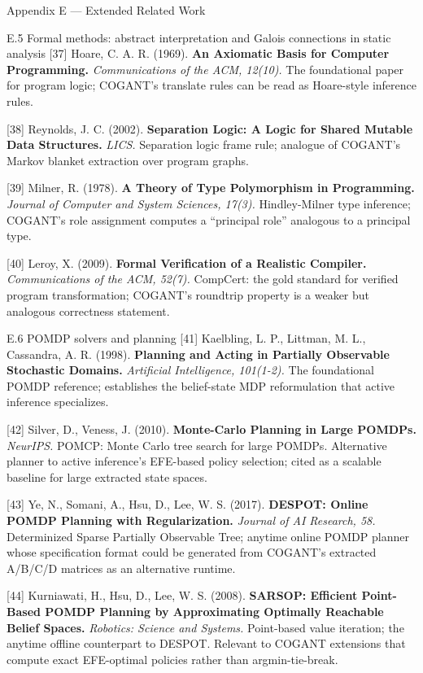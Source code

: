 \documentclass[
  ignorenonframetext,
]{beamer}
\begin{document}
\begin{frame}[fragile]{Appendix E --- Extended Related Work}
\begin{block}{E.5 Formal methods: abstract interpretation and Galois
connections in static analysis}
{[}37{]} Hoare, C. A. R. (1969). \textbf{An Axiomatic Basis for Computer
Programming.} \emph{Communications of the ACM, 12(10).} The foundational
paper for program logic; COGANT's translate rules can be read as
Hoare-style inference rules.

{[}38{]} Reynolds, J. C. (2002). \textbf{Separation Logic: A Logic for
Shared Mutable Data Structures.} \emph{LICS.} Separation logic frame
rule; analogue of COGANT's Markov blanket extraction over program
graphs.

{[}39{]} Milner, R. (1978). \textbf{A Theory of Type Polymorphism in
Programming.} \emph{Journal of Computer and System Sciences, 17(3).}
Hindley-Milner type inference; COGANT's role assignment computes a
``principal role'' analogous to a principal type.

{[}40{]} Leroy, X. (2009). \textbf{Formal Verification of a Realistic
Compiler.} \emph{Communications of the ACM, 52(7).} CompCert: the gold
standard for verified program transformation; COGANT's roundtrip
property is a weaker but analogous correctness statement.
\end{block}

\begin{block}{E.6 POMDP solvers and planning}
\protect{}\label{e.6-pomdp-solvers-and-planning}
{[}41{]} Kaelbling, L. P., Littman, M. L., Cassandra, A. R. (1998).
\textbf{Planning and Acting in Partially Observable Stochastic Domains.}
\emph{Artificial Intelligence, 101(1-2).} The foundational POMDP
reference; establishes the belief-state MDP reformulation that active
inference specializes.

{[}42{]} Silver, D., Veness, J. (2010). \textbf{Monte-Carlo Planning in
Large POMDPs.} \emph{NeurIPS.} POMCP: Monte Carlo tree search for large
POMDPs. Alternative planner to active inference's EFE-based policy
selection; cited as a scalable baseline for large extracted state
spaces.

{[}43{]} Ye, N., Somani, A., Hsu, D., Lee, W. S. (2017). \textbf{DESPOT:
Online POMDP Planning with Regularization.} \emph{Journal of AI
Research, 58.} Determinized Sparse Partially Observable Tree; anytime
online POMDP planner whose specification format could be generated from
COGANT's extracted A/B/C/D matrices as an alternative runtime.

{[}44{]} Kurniawati, H., Hsu, D., Lee, W. S. (2008). \textbf{SARSOP:
Efficient Point-Based POMDP Planning by Approximating Optimally
Reachable Belief Spaces.} \emph{Robotics: Science and Systems.}
Point-based value iteration; the anytime offline counterpart to DESPOT.
Relevant to COGANT extensions that compute exact EFE-optimal policies
rather than argmin-tie-break.


\end{block}
\end{frame}
\end{document}
